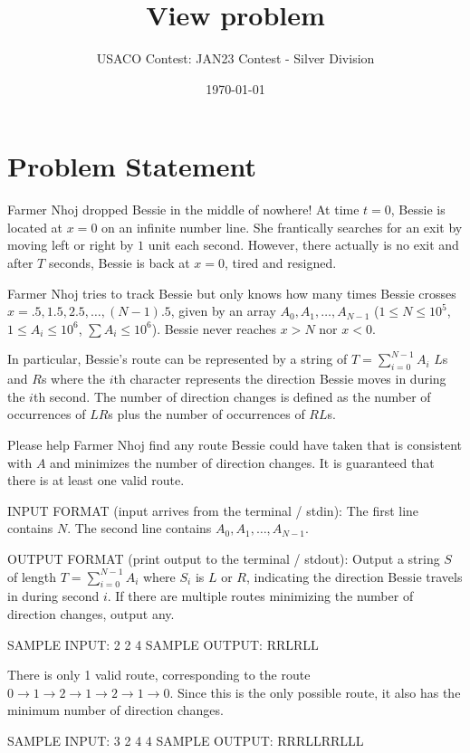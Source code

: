 \documentclass[12pt]{article}
\title{View problem}
\author{USACO Contest: JAN23 Contest - Silver Division}
\date{\today}
\begin{document}
\maketitle

\section*{Problem Statement}


Farmer Nhoj dropped Bessie in the middle of nowhere! At time $t=0$, Bessie is
located at $x=0$ on an infinite number line. She frantically searches for an
exit by moving left or right by $1$ unit each second. However, there actually is
no exit and after $T$ seconds, Bessie is back at $x=0$, tired and resigned. 

Farmer Nhoj tries to track Bessie but only knows how many times Bessie crosses
$x=.5, 1.5, 2.5, \ldots, (N-1).5$, given by an array $A_0,A_1,\dots,A_{N-1}$
($1\leq N \leq 10^5$, $1 \leq A_i \leq 10^6$, $\sum A_i\le 10^6$). Bessie never
reaches $x>N$ nor
$x<0$.

In particular, Bessie's route can be represented by a string of
$T = \sum_{i=0}^{N-1} A_i$ $L$s and $R$s where the $i$th character represents
the direction Bessie moves in during the $i$th second. The number of direction
changes is defined as the number of occurrences of $LR$s plus the number of
occurrences of $RL$s. 

Please help Farmer Nhoj find any route Bessie could have taken that is
consistent with $A$ and minimizes the number of direction changes. It is
guaranteed that there is at least one valid route.

INPUT FORMAT (input arrives from the terminal / stdin):
The first line contains $N$. The second line contains $A_0,A_1,\dots,A_{N-1}$.

OUTPUT FORMAT (print output to the terminal / stdout):
Output a string $S$ of length $T = \sum_{i=0}^{N-1} A_i$ where $S_i$ is $L$ or
$R$, indicating the direction Bessie travels in during second $i$. If there are
multiple routes minimizing the number of direction changes, output any.

SAMPLE INPUT:
2
2 4
SAMPLE OUTPUT: 
RRLRLL

There is only 1 valid route, corresponding to the route
$0\to 1 \to 2 \to 1\to 2 \to 1\to 0$. Since this is the only possible route, it
also has the minimum number of direction changes.

SAMPLE INPUT:
3
2 4 4
SAMPLE OUTPUT: 
RRRLLRRLLL
\end{document}
